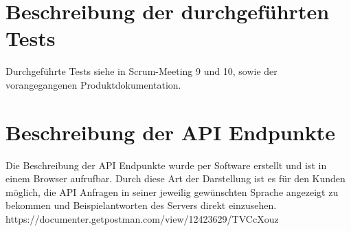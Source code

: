 \documentclass[a4paper,report,headsepline]{scrreprt}
\begin{document}
\chapter{Beschreibung der durchgeführten Tests}
Durchgeführte Tests siehe in Scrum-Meeting 9 und 10, sowie der vorangegangenen Produktdokumentation.
\chapter{Beschreibung der API Endpunkte}  
Die Beschreibung der API Endpunkte wurde per Software erstellt und ist in einem Browser aufrufbar. Durch diese Art der Darstellung ist es für den Kunden möglich, die API Anfragen in seiner jeweilig gewünschten Sprache angezeigt zu bekommen und Beispielantworten des Servers direkt einzusehen. \\
https://documenter.getpostman.com/view/12423629/TVCcXouz      


\begin{figure}[h]
\end{figure}
\end{document}
